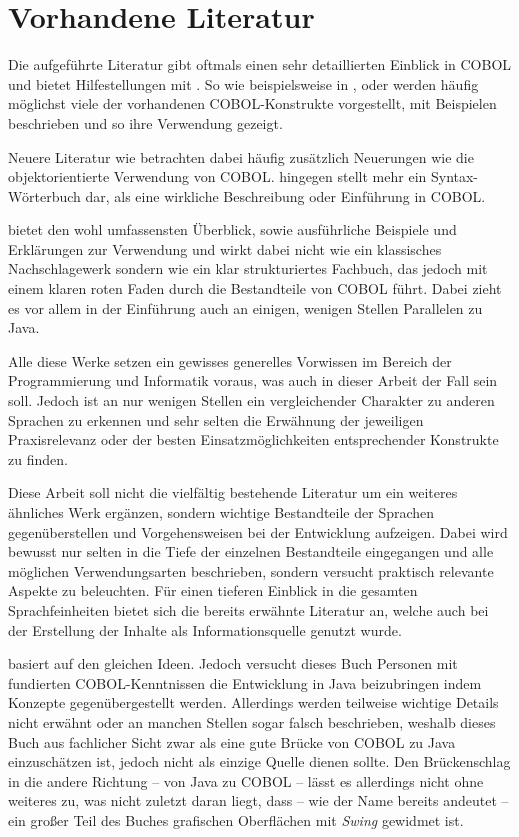 \section{Vorhandene Literatur}
Die aufgeführte Literatur gibt oftmals einen sehr detaillierten Einblick in COBOL und bietet Hilfestellungen mit . So wie beispielsweise in ,   oder  werden häufig möglichst viele der vorhandenen COBOL-Konstrukte vorgestellt, mit Beispielen beschrieben und so ihre Verwendung gezeigt. 

Neuere Literatur wie  betrachten dabei häufig zusätzlich Neuerungen wie die objektorientierte Verwendung von COBOL.  
hingegen stellt mehr ein Syntax-Wörterbuch dar, als eine wirkliche Beschreibung oder Einführung in COBOL.

 bietet den wohl umfassensten Überblick, sowie ausführliche Beispiele und Erklärungen zur Verwendung und wirkt dabei nicht wie ein klassisches Nachschlagewerk sondern wie ein klar strukturiertes Fachbuch, das jedoch mit einem klaren roten Faden durch die Bestandteile von COBOL führt. Dabei zieht es vor allem in der Einführung auch an einigen, wenigen Stellen Parallelen zu Java. 

Alle diese Werke setzen ein gewisses generelles Vorwissen im Bereich der Programmierung und Informatik voraus, was auch in dieser Arbeit der Fall sein soll. Jedoch ist an nur wenigen Stellen ein vergleichender Charakter zu anderen Sprachen zu erkennen und sehr selten die Erwähnung der jeweiligen Praxisrelevanz oder der besten Einsatzmöglichkeiten entsprechender Konstrukte zu finden. 

Diese Arbeit soll nicht die vielfältig bestehende Literatur um ein weiteres ähnliches Werk ergänzen, sondern wichtige Bestandteile der Sprachen gegenüberstellen und Vorgehensweisen bei der Entwicklung aufzeigen. Dabei wird bewusst nur selten in die Tiefe der einzelnen Bestandteile eingegangen und alle möglichen Verwendungsarten beschrieben, sondern versucht praktisch relevante Aspekte zu beleuchten. Für einen tieferen Einblick in die gesamten Sprachfeinheiten bietet sich die bereits erwähnte Literatur an, welche auch bei der Erstellung der Inhalte als Informationsquelle genutzt wurde.

 basiert auf den gleichen Ideen. Jedoch versucht dieses Buch Personen mit fundierten COBOL-Kenntnissen die Entwicklung in Java beizubringen indem Konzepte gegenübergestellt werden. Allerdings werden teilweise wichtige Details nicht erwähnt oder an manchen Stellen sogar falsch beschrieben, weshalb dieses Buch aus fachlicher Sicht zwar als eine gute Brücke von COBOL zu Java einzuschätzen ist, jedoch nicht als einzige Quelle dienen sollte. Den Brückenschlag in die andere Richtung -- von Java zu COBOL -- lässt es allerdings nicht ohne weiteres zu, was nicht zuletzt daran liegt, dass -- wie der Name bereits andeutet -- ein großer Teil des Buches grafischen Oberflächen mit \textit{Swing} gewidmet ist.

